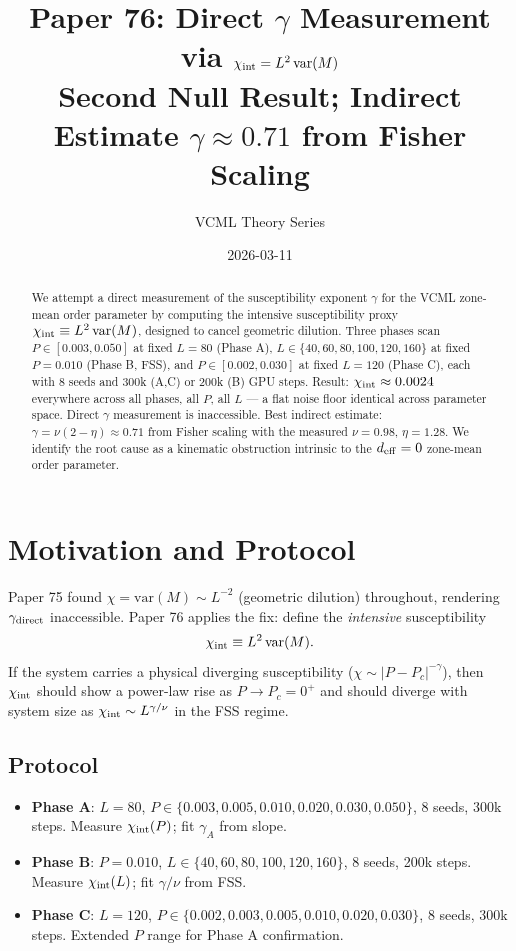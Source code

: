 \documentclass[11pt,a4paper]{article}
\title{\textbf{Paper 76: Direct $\gamma$ Measurement via $\chi_{\rm int} = L^2\,\mathrm{var}(M)$\\
       Second Null Result; Indirect Estimate $\gamma \approx 0.71$ from Fisher Scaling}}
\author{VCML Theory Series}
\date{2026-03-11}
\begin{document}
\maketitle

\begin{abstract}
We attempt a direct measurement of the susceptibility exponent $\gamma$ for the VCML
zone-mean order parameter by computing the intensive susceptibility proxy
$\chi_{\rm int} \equiv L^2\,\mathrm{var}(M)$, designed to cancel geometric dilution.
Three phases scan $P \in [0.003, 0.050]$ at fixed $L=80$ (Phase A),
$L \in \{40, 60, 80, 100, 120, 160\}$ at fixed $P=0.010$ (Phase B, FSS),
and $P \in [0.002, 0.030]$ at fixed $L=120$ (Phase C),
each with 8 seeds and 300k (A,C) or 200k (B) GPU steps.
Result: $\chi_{\rm int} \approx 0.0024$ everywhere across all phases, all $P$,
all $L$ --- a flat noise floor identical across parameter space.
Direct $\gamma$ measurement is inaccessible.
Best indirect estimate: $\gamma = \nu(2-\eta) \approx 0.71$ from Fisher scaling
with the measured $\nu = 0.98$, $\eta = 1.28$.
We identify the root cause as a kinematic obstruction intrinsic to the
$d_{\rm eff} = 0$ zone-mean order parameter.
\end{abstract}

\section{Motivation and Protocol}

Paper 75 found $\chi = \mathrm{var}(M) \sim L^{-2}$ (geometric dilution) throughout,
rendering $\gamma_{\rm direct}$ inaccessible.  Paper 76 applies the fix:
define the \emph{intensive} susceptibility
\begin{equation}
  \chi_{\rm int} \equiv L^2 \,\mathrm{var}(M).
  \label{eq:chiint}
\end{equation}
If the system carries a physical diverging susceptibility ($\chi \sim |P - P_c|^{-\gamma}$),
then $\chi_{\rm int}$ should show a power-law rise as $P \to P_c = 0^+$ and should
diverge with system size as $\chi_{\rm int} \sim L^{\gamma/\nu}$ in the FSS regime.

\subsection*{Protocol}

\begin{itemize}
  \item \textbf{Phase A}: $L=80$, $P \in \{0.003, 0.005, 0.010, 0.020, 0.030, 0.050\}$,
    8 seeds, 300k steps. Measure $\chi_{\rm int}(P)$; fit $\gamma_A$ from slope.
  \item \textbf{Phase B}: $P=0.010$, $L \in \{40, 60, 80, 100, 120, 160\}$,
    8 seeds, 200k steps. Measure $\chi_{\rm int}(L)$; fit $\gamma/\nu$ from FSS.
  \item \textbf{Phase C}: $L=120$, $P \in \{0.002, 0.003, 0.005, 0.010, 0.020, 0.030\}$,
    8 seeds, 300k steps. Extended $P$ range for Phase A confirmation.
\end{itemize}
\end{document}
